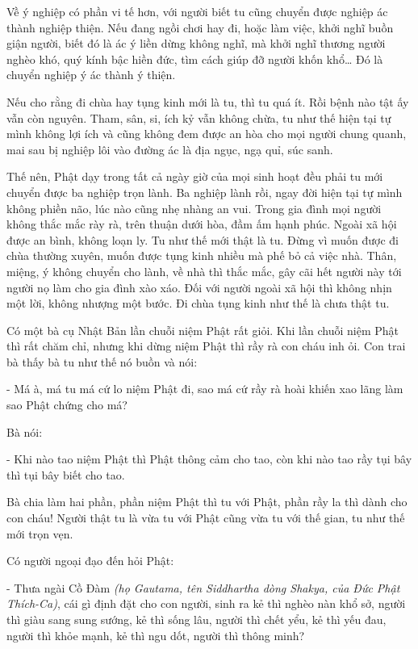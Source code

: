 \documentclass[
  12pt,
  oneside]{book}
\begin{document}
Về ý nghiệp có phần vi tế hơn, với người biết tu cũng chuyển được nghiệp ác thành nghiệp thiện. Nếu đang ngồi chơi hay đi, hoặc làm việc, khởi nghĩ buồn giận người, biết đó là ác ý liền dừng không nghĩ, mà khởi nghĩ thương người nghèo khó, quý kính bậc hiền đức, tìm cách giúp đỡ người khốn khổ\ldots{} Đó là chuyển nghiệp ý ác thành ý thiện.

Nếu cho rằng đi chùa hay tụng kinh mới là tu, thì tu quá ít. Rồi bệnh nào tật ấy vẫn còn nguyên. Tham, sân, si, ích kỷ vẫn không chừa, tu như thế hiện tại tự mình không lợi ích và cũng không đem được an hòa cho mọi người chung quanh, mai sau bị nghiệp lôi vào đường ác là địa ngục, ngạ quỉ, súc sanh.

Thế nên, Phật dạy trong tất cả ngày giờ của mọi sinh hoạt đều phải tu mới chuyển được ba nghiệp trọn lành. Ba nghiệp lành rồi, ngay đời hiện tại tự mình không phiền não, lúc nào cũng nhẹ nhàng an vui. Trong gia đình mọi người không thắc mắc rày rà, trên thuận dưới hòa, đầm ấm hạnh phúc. Ngoài xã hội được an bình, không loạn ly. Tu như thế mới thật là tu. Đừng vì muốn được đi chùa thường xuyên, muốn được tụng kinh nhiều mà phế bỏ cả việc nhà. Thân, miệng, ý không chuyển cho lành, về nhà thì thắc mắc, gây cãi hết người này tới người nọ làm cho gia đình xào xáo. Đối với người ngoài xã hội thì không nhịn một lời, không nhượng một bước. Đi chùa tụng kinh như thế là chưa thật tu.

Có một bà cụ Nhật Bản lần chuỗi niệm Phật rất giỏi. Khi lần chuỗi niệm Phật thì rất chăm chỉ, nhưng khi dừng niệm Phật thì rầy rà con cháu inh ỏi. Con trai bà thấy bà tu như thế nó buồn và nói:

- Má à, má tu má cứ lo niệm Phật đi, sao má cứ rầy rà hoài khiến xao lãng làm sao Phật chứng cho má?

Bà nói:

- Khi nào tao niệm Phật thì Phật thông cảm cho tao, còn khi nào tao rầy tụi bây thì tụi bây biết cho tao.

Bà chia làm hai phần, phần niệm Phật thì tu với Phật, phần rầy la thì dành cho con cháu! Người thật tu là vừa tu với Phật cũng vừa tu với thế gian, tu như thế mới trọn vẹn.

Có người ngoại đạo đến hỏi Phật:

- Thưa ngài Cồ Đàm \emph{(họ Gautama, tên Siddhartha dòng Shakya, của Đức Phật Thích-Ca)}, cái gì định đặt cho con người, sinh ra kẻ thì nghèo nàn khổ sở, người thì giàu sang sung sướng, kẻ thì sống lâu, người thì chết yểu, kẻ thì yếu đau, người thì khỏe mạnh, kẻ thì ngu dốt, người thì thông minh?
\end{document}
